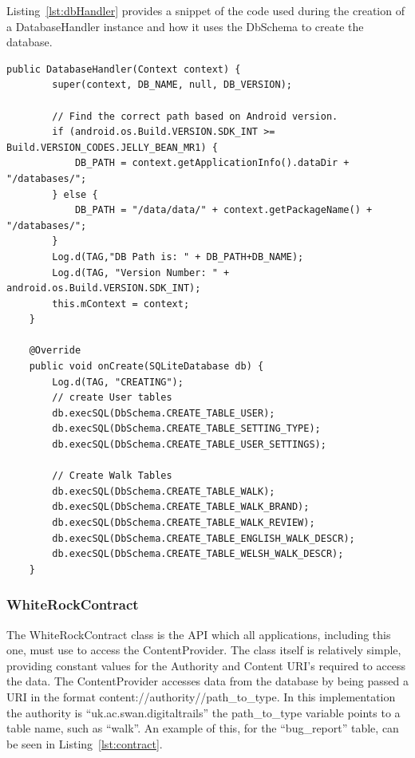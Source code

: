 \documentclass[11pt,a4paper]{article}
\begin{document}
Listing~\ref{lst:dbHandler} provides a snippet of the code used during the creation of a DatabaseHandler instance and how it uses the DbSchema to create the database.

\begin{lstlisting}[captionpos=b, caption=DatabaseHandler Snippet, label=lst:dbHandler, frame=single]
	public DatabaseHandler(Context context) {
		super(context, DB_NAME, null, DB_VERSION);
		
		// Find the correct path based on Android version.
		if (android.os.Build.VERSION.SDK_INT >= Build.VERSION_CODES.JELLY_BEAN_MR1) {
			DB_PATH = context.getApplicationInfo().dataDir + "/databases/";
		} else {
			DB_PATH = "/data/data/" + context.getPackageName() + "/databases/";
		}
		Log.d(TAG,"DB Path is: " + DB_PATH+DB_NAME);
		Log.d(TAG, "Version Number: " + android.os.Build.VERSION.SDK_INT);
		this.mContext = context;
	}

	@Override
	public void onCreate(SQLiteDatabase db) {
		Log.d(TAG, "CREATING");
		// create User tables
		db.execSQL(DbSchema.CREATE_TABLE_USER);
		db.execSQL(DbSchema.CREATE_TABLE_SETTING_TYPE);
		db.execSQL(DbSchema.CREATE_TABLE_USER_SETTINGS);
		
		// Create Walk Tables
		db.execSQL(DbSchema.CREATE_TABLE_WALK);
		db.execSQL(DbSchema.CREATE_TABLE_WALK_BRAND);
		db.execSQL(DbSchema.CREATE_TABLE_WALK_REVIEW);
		db.execSQL(DbSchema.CREATE_TABLE_ENGLISH_WALK_DESCR);
		db.execSQL(DbSchema.CREATE_TABLE_WELSH_WALK_DESCR);
	}
\end{lstlisting}

\subsubsection{WhiteRockContract}
The WhiteRockContract class is the API which all applications, including this one, must use to access the ContentProvider. The class itself is relatively simple, providing constant values for the Authority and Content URI's required to access the data. The ContentProvider accesses data from the database by being passed a URI in the format content://authority//path\_to\_type. In this implementation the authority is ``uk.ac.swan.digitaltrails'' the path\_to\_type variable points to a table name, such as ``walk''. An example of this, for the ``bug\_report'' table, can be seen in Listing~\ref{lst:contract}.
\end{document}
